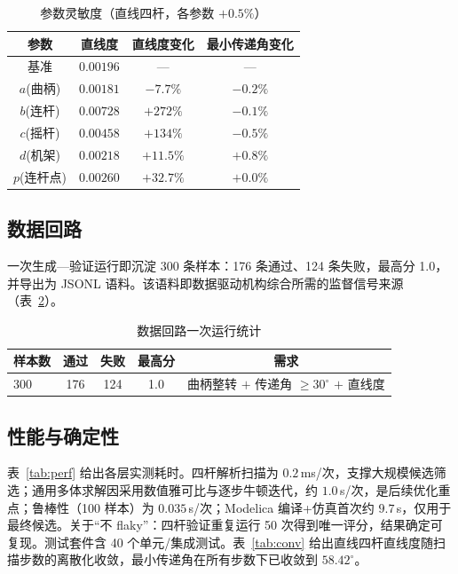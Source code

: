 \documentclass[UTF8,11pt,a4paper]{ctexart}
\begin{document}
\begin{table}[htbp]
\centering
\caption{参数灵敏度（直线四杆，各参数 $+0.5\%$）}
\label{tab:sens}
\begin{tabular}{cccc}
\toprule
参数 & 直线度 & 直线度变化 & 最小传递角变化 \\
\midrule
基准 & $0.00196$ & --- & --- \\
$a$(曲柄) & $0.00181$ & $-7.7\%$ & $-0.2\%$ \\
$b$(连杆) & $0.00728$ & $+272\%$ & $-0.1\%$ \\
$c$(摇杆) & $0.00458$ & $+134\%$ & $-0.5\%$ \\
$d$(机架) & $0.00218$ & $+11.5\%$ & $+0.8\%$ \\
$p$(连杆点) & $0.00260$ & $+32.7\%$ & $+0.0\%$ \\
\bottomrule
\end{tabular}
\end{table}

\subsection{数据回路}
一次生成—验证运行即沉淀 300 条样本：176 条通过、124 条失败，最高分 1.0，并导出为 JSONL 语料。该语料即数据驱动机构综合所需的监督信号来源（表~\ref{tab:corpus}）。

\begin{table}[htbp]
\centering
\caption{数据回路一次运行统计}
\label{tab:corpus}
\begin{tabular}{lcccc}
\toprule
样本数 & 通过 & 失败 & 最高分 & 需求 \\
\midrule
300 & 176 & 124 & 1.0 & 曲柄整转 $+$ 传递角 $\ge 30^\circ$ $+$ 直线度 \\
\bottomrule
\end{tabular}
\end{table}

\subsection{性能与确定性}
表~\ref{tab:perf} 给出各层实测耗时。四杆解析扫描为 $0.2$\,ms/次，支撑大规模候选筛选；通用多体求解因采用数值雅可比与逐步牛顿迭代，约 $1.0$\,s/次，是后续优化重点；鲁棒性（100 样本）为 $0.035$\,s/次；Modelica 编译+仿真首次约 $9.7$\,s，仅用于最终候选。关于``不 flaky''：四杆验证重复运行 50 次得到唯一评分，结果确定可复现。测试套件含 40 个单元/集成测试。表~\ref{tab:conv} 给出直线四杆直线度随扫描步数的离散化收敛，最小传递角在所有步数下已收敛到 $58.42^\circ$。
\end{document}
